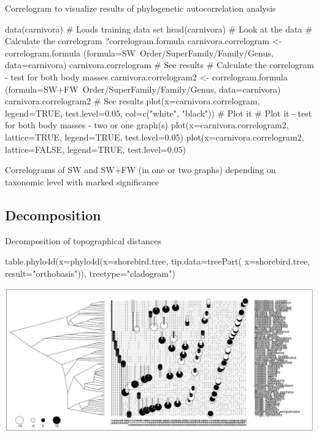 \documentclass[compress, ucs, xelatex, 11pt, xcolor=svgnames, aspectratio=169,
	hyperref={
		bookmarks=true,
		unicode=true,
		colorlinks=true,
		pdftitle={Molecular data in R},
		plainpages=false,
		pdfauthor={Vojtech Zeisek},
		pdfsubject={Course about phylogeny and evolution in R},
		pdfcreator={XeLaTeX},
		pdfkeywords={R, evolution, phylogeny, molecular data},
		linkcolor=Crimson, %
		anchorcolor=Magenta, %
		citecolor=Magenta, %
		filecolor=Magenta, %
		menucolor=Magenta, %
		urlcolor=DodgerBlue, %
		pdftex},
	url={hyphens, lowtilde} %
	]{beamer}
\renewcommand{\texttt}[1]{\colorbox{Beige}{{\ttfamily #1}}}
\begin{document}
\begin{frame}[fragile]{Correlogram to visualize results of phylogenetic autocorrelation analysis}
	\begin{spluscode}
    data(carnivora) # Loads training data set
    head(carnivora) # Look at the data
    # Calculate the correlogram
    ?correlogram.formula
    carnivora.correlogram <- correlogram.formula
      (formula=SW~Order/SuperFamily/Family/Genus, data=carnivora)
    carnivora.correlogram # See results
    # Calculate the correlogram - test for both body masses
    carnivora.correlogram2 <- correlogram.formula
      (formula=SW+FW~Order/SuperFamily/Family/Genus, data=carnivora)
    carnivora.correlogram2 # See results
    plot(x=carnivora.correlogram, legend=TRUE, test.level=0.05, col=c("white",
      "black")) # Plot it
    # Plot it - test for both body masses - two or one graph(s)
    plot(x=carnivora.correlogram2, lattice=TRUE, legend=TRUE, test.level=0.05)
    plot(x=carnivora.correlogram2, lattice=FALSE, legend=TRUE, test.level=0.05)
	\end{spluscode}
\end{frame}

\begin{frame}{Correlograms of SW and SW+FW (in one or two graphs) depending on taxonomic level with marked significance}
	\texttt{[image: correlog.png]}
\end{frame}

\subsection{Decomposition}

\begin{frame}[fragile]{Decomposition of topographical distances}
	\begin{spluscode}
    table.phylo4d(x=phylo4d(x=shorebird.tree, tip.data=treePart(
      x=shorebird.tree, result="orthobasis")), treetype="cladogram")
	\end{spluscode}
	\begin{center}
		\includegraphics[width=\textwidth-3.5cm]{shorebird_tree_decomp.png}
	\end{center}
\end{frame}
\end{document}
